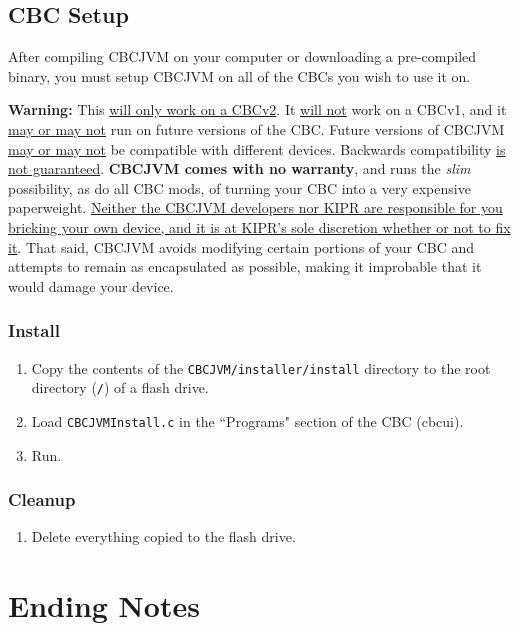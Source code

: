 \documentclass[12pt,letterpaper]{article}
\begin{document}
\subsection{CBC Setup}

After compiling CBCJVM on your computer or downloading a pre-compiled binary, you must setup CBCJVM on all of the CBCs you wish to use it on.

\textbf{Warning:} This \uline{will only work on a CBCv2}. It \uline{will not} work on a CBCv1, and it \uline{may or may not} run on future versions of the CBC. Future versions of CBCJVM \uline{may or may not} be compatible with different devices. Backwards compatibility \uline{is not guaranteed}. \textbf{CBCJVM comes with no warranty}, and runs the \emph{slim} possibility, as do all CBC mods, of turning your CBC into a very expensive paperweight. \uline{Neither the CBCJVM developers nor KIPR are responsible for you bricking your own device, and it is at KIPR's sole discretion whether or not to fix it}. That said, CBCJVM avoids modifying certain portions of your CBC and attempts to remain as encapsulated as possible, making it improbable that it would damage your device.



\subsubsection{Install}

\begin{enumerate}
\item Copy the contents of the \texttt{CBCJVM/installer/install} directory to the root directory (\texttt{/}) of a flash drive.
\item Load \texttt{CBCJVMInstall.c} in the ``Programs" section of the CBC (cbcui).
\item Run.
\end{enumerate}



\subsubsection{Cleanup}

\begin{enumerate}
\item Delete everything copied to the flash drive.
\end{enumerate}



\pagebreak
\section{Ending Notes}
\end{document}
